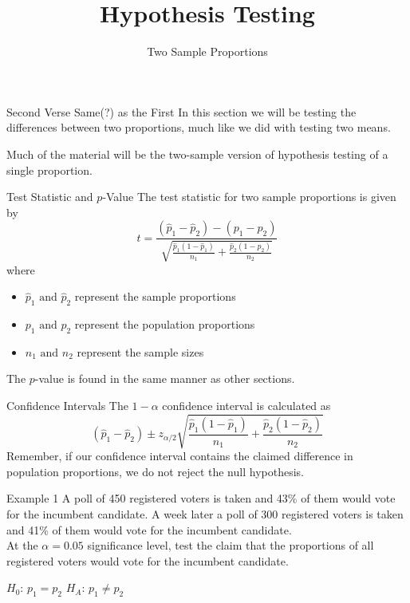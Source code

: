\documentclass[t]{beamer}
\title{Hypothesis Testing}
\subtitle{Two Sample Proportions}
\author{}
\date{}
\begin{document}

\begin{frame} 
\maketitle
\end{frame}

\begin{frame}{Second Verse Same(?) as the First}
In this section we will be testing the differences between two proportions, much like we did with testing two means. \newline\\	\pause

Much of the material will be the two-sample version of hypothesis testing of a single proportion.
\end{frame}

\begin{frame}{Test Statistic and $p$-Value}
The test statistic for two sample proportions is given by
\[
t = \frac{(\hat{p}_1-\hat{p}_2) - (p_1 - p_2)}{\sqrt{\frac{\hat{p}_1(1-\hat{p}_1)}{n_1}+\frac{\hat{p}_2(1-\hat{p}_2)}{n_2}}}
\]
where 	\pause
\begin{itemize}
	\item $\hat{p}_1 \text{ and } \hat{p}_2$ represent the sample proportions	\pause
	\item $p_1 \text{ and } p_2$ represent the population proportions	\pause
	\item $n_1 \text{ and } n_2$ represent the sample sizes	\pause
\end{itemize}

The $p$-value is found in the same manner as other sections.
\end{frame}

\begin{frame}{Confidence Intervals}
The $1-\alpha$ confidence interval is calculated as
\[
(\hat{p}_1 - \hat{p}_2) \pm z_{\alpha/2}\sqrt{\frac{\hat{p}_1(1-\hat{p}_1)}{n_1}+\frac{\hat{p}_2(1-\hat{p}_2)}{n_2}}
\]	\pause
Remember, if our confidence interval contains the claimed difference in population proportions, we do not reject the null hypothesis.
\end{frame}

\begin{frame}{Example 1}
A poll of 450 registered voters is taken and 43\% of them would vote for the incumbent candidate. A week later a poll of 300 registered voters is taken and 41\% of them would vote for the incumbent candidate. \newline\\

At the $\alpha = 0.05$ significance level, test the claim that the proportions of all registered voters would vote for the incumbent candidate.	\newline\\	\pause

$H_0: \, p_1 = p_2$ \newline	\pause
$H_A: \, p_1 \neq p_2$

\end{frame}
\end{document}
